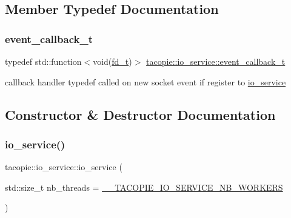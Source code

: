 \subsection{Member Typedef Documentation}
\mbox{\label{classtacopie_1_1io__service_abb66850c32d9c724f4418d77bd04bcfd}} 
\subsubsection{\texorpdfstring{event\+\_\+callback\+\_\+t}{event\_callback\_t}}
{\footnotesize\ttfamily typedef std\+::function$<$void(\hyperlink{namespacetacopie_acce7ad26b2d30156b1e6fa353f727026}{fd\+\_\+t})$>$ \hyperlink{classtacopie_1_1io__service_abb66850c32d9c724f4418d77bd04bcfd}{tacopie\+::io\+\_\+service\+::event\+\_\+callback\+\_\+t}}

callback handler typedef called on new socket event if register to \hyperlink{classtacopie_1_1io__service}{io\+\_\+service} 

\subsection{Constructor \& Destructor Documentation}
\mbox{\label{classtacopie_1_1io__service_a62edde9b62571610413d99d075df8102}} 
\subsubsection{\texorpdfstring{io\+\_\+service()}{io\_service()}\hspace{0.1cm}{\footnotesize\ttfamily [1/2]}}
{\footnotesize\ttfamily tacopie\+::io\+\_\+service\+::io\+\_\+service (\begin{DoxyParamCaption}\item[{std\+::size\+\_\+t}]{nb\+\_\+threads = {\ttfamily \hyperlink{io__service_8hpp_a822f465d034836ecbc765ad422eec064}{\+\_\+\+\_\+\+T\+A\+C\+O\+P\+I\+E\+\_\+\+I\+O\+\_\+\+S\+E\+R\+V\+I\+C\+E\+\_\+\+N\+B\+\_\+\+W\+O\+R\+K\+E\+RS}} }\end{DoxyParamCaption})}

